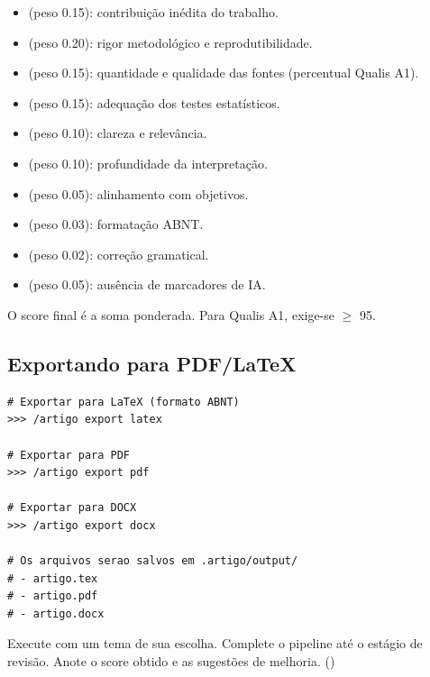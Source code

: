\begin{itemize}
\item {} (peso 0.15): contribuição inédita do
      trabalho.
\item {} (peso 0.20): rigor metodológico e
      reprodutibilidade.
\item {} (peso 0.15): quantidade e qualidade das
      fontes (percentual Qualis A1).
\item {} (peso 0.15): adequação dos testes
      estatísticos.
\item {} (peso 0.10): clareza e relevância.
\item {} (peso 0.10): profundidade da interpretação.
\item {} (peso 0.05): alinhamento com objetivos.
\item {} (peso 0.03): formatação ABNT.
\item {} (peso 0.02): correção gramatical.
\item {} (peso 0.05): ausência de marcadores de IA.
\end{itemize}

O score final é a soma ponderada. Para Qualis A1, exige-se $\geq$ 95.

\subsection{Exportando para PDF/LaTeX}
\label{subsec:export-artigo}

\begin{lstlisting}[style=bashstyle, caption={Exportando o artigo para
diferentes formatos}, label={lst:artigo-export}]
# Exportar para LaTeX (formato ABNT)
>>> /artigo export latex

# Exportar para PDF
>>> /artigo export pdf

# Exportar para DOCX
>>> /artigo export docx

# Os arquivos serao salvos em .artigo/output/
# - artigo.tex
# - artigo.pdf
# - artigo.docx
\end{lstlisting}

\begin{exercicio}
Execute  com um tema de sua escolha. Complete
o pipeline até o estágio de revisão. Anote o score obtido e as
sugestões de melhoria. (\nivelintermediario)
\end{exercicio}

